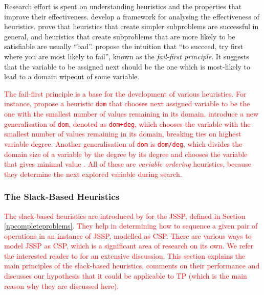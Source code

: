 \documentclass{mprop}
\theoremstyle{definition}
\begin{document}
Research effort is spent on understanding heuristics and the properties that improve their effectiveness. \citet{Christopher03} develop a framework for analysing the effectiveness of  heuristics. \citet{Hooker95} prove that heuristics that create simpler subproblems are successful in general, and heuristics that create subproblems that are more likely to be satisfiable are usually ``bad''. \citet{Haralick80} propose the intuition that ``to succeed, try first where you are most likely to fail'', known as the \textit{fail-first principle}. It suggests that the variable to be assigned next should be the one which is most-likely to lead to a domain wipeout of some variable.

\textcolor{red}{
The fail-first principle is a base for the development of various heuristics. For instance, \citet{Golomb65} propose a heuristic \texttt{dom} that chooses next assigned variable to be the one with the smallest number of values remaining in its domain. \citet{Brelaz79} introduce a new generalisation of \texttt{dom}, denoted as \texttt{dom+deg}, which chooses the variable with the smallest number of values remaining in its domain, breaking ties on highest variable degree. Another generalisation of \texttt{dom} is \texttt{dom/deg}, which divides the domain size of a variable by the degree by its degree and chooses the variable that gives minimal value \citep{Bessiere96}. All of these are \textit{variable ordering} heuristics, because they determine the next explored variable during search.}



\subsubsection*{The Slack-Based Heuristics}
\textcolor{red}{
The slack-based heuristics are introduced by \citet{Smith93} for the JSSP, defined in Section \ref{npcompleteproblems}. They help in determining how to sequence a given pair of operations in an instance of JSSP, modelled as CSP. There are various ways to model JSSP as CSP, which is a significant area of research on its own. We refer the interested reader to \citet[Chapter~22]{cpbible} for an extensive discussion.
This section explains the main principles of the slack-based heuristics, comments on their performance and discusses our hypothesis that it could be applicable to TP (which is the main reason why they are discussed here).
}
\end{document}
